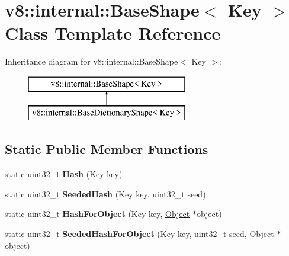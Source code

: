 \hypertarget{classv8_1_1internal_1_1_base_shape}{}\section{v8\+:\+:internal\+:\+:Base\+Shape$<$ Key $>$ Class Template Reference}
\label{classv8_1_1internal_1_1_base_shape}
Inheritance diagram for v8\+:\+:internal\+:\+:Base\+Shape$<$ Key $>$\+:\begin{figure}[H]
\begin{center}
\leavevmode
\includegraphics[height=2.000000cm]{classv8_1_1internal_1_1_base_shape}
\end{center}
\end{figure}
\subsection*{Static Public Member Functions}
\begin{DoxyCompactItemize}
\item 
static uint32\+\_\+t {\bfseries Hash} (Key key)\hypertarget{classv8_1_1internal_1_1_base_shape_a8111960b11712048e3e15179ad2b9fda}{}\label{classv8_1_1internal_1_1_base_shape_a8111960b11712048e3e15179ad2b9fda}

\item 
static uint32\+\_\+t {\bfseries Seeded\+Hash} (Key key, uint32\+\_\+t seed)\hypertarget{classv8_1_1internal_1_1_base_shape_a2d348acd6f23c45cc155cf7bcb788a15}{}\label{classv8_1_1internal_1_1_base_shape_a2d348acd6f23c45cc155cf7bcb788a15}

\item 
static uint32\+\_\+t {\bfseries Hash\+For\+Object} (Key key, \hyperlink{classv8_1_1internal_1_1_object}{Object} $\ast$object)\hypertarget{classv8_1_1internal_1_1_base_shape_ab025c536a6b030fab39f62934b25edce}{}\label{classv8_1_1internal_1_1_base_shape_ab025c536a6b030fab39f62934b25edce}

\item 
static uint32\+\_\+t {\bfseries Seeded\+Hash\+For\+Object} (Key key, uint32\+\_\+t seed, \hyperlink{classv8_1_1internal_1_1_object}{Object} $\ast$object)\hypertarget{classv8_1_1internal_1_1_base_shape_ae3cd2d2f821c879f0deea40def681bd1}{}\label{classv8_1_1internal_1_1_base_shape_ae3cd2d2f821c879f0deea40def681bd1}

\end{DoxyCompactItemize}
